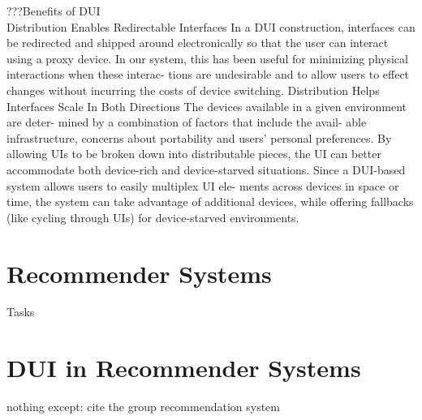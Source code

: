 ???Benefits of DUI \cite{chen2011distributed}\\
Distribution Enables Redirectable Interfaces
In a DUI construction, interfaces can be redirected and shipped around electronically so that the user can interact using a proxy device. In our system, this has been useful for minimizing physical interactions when these interac- tions are undesirable and to allow users to effect changes without incurring the costs of device switching.
Distribution Helps Interfaces Scale In Both Directions
The devices available in a given environment are deter- mined by a combination
of factors that include the avail- able infrastructure, concerns about
portability and users' personal preferences. By allowing UIs to be broken down into distributable pieces, the UI can better accommodate both device-rich and device-starved situations. Since a DUI-based system allows users to easily multiplex UI ele- ments across devices in space or time, the system can take advantage of additional devices, while offering fallbacks (like cycling through UIs) for device-starved environments.\\


\section{Recommender Systems}
Tasks

\section{DUI in Recommender Systems}
nothing except: cite the group recommendation system \cite{worndlvoting}
